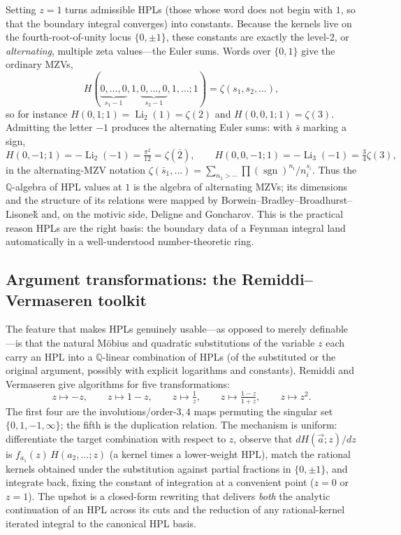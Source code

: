 \documentclass[11pt]{article}
\DeclareMathOperator{\Li}{Li}
\theoremstyle{plain}
\theoremstyle{remark}
\begin{document}
Setting $z=1$ turns admissible HPLs (those whose word does not begin with $1$, so that the boundary integral converges) into constants. Because the kernels live on the fourth-root-of-unity locus $\{0,\pm1\}$, these constants are exactly the level-$2$, or \emph{alternating}, multiple zeta values---the Euler sums. Words over $\{0,1\}$ give the ordinary MZVs,
\begin{equation}\label{eq:hpl-mzv}
  H(\underbrace{0,\dots,0}_{s_1-1},1,\underbrace{0,\dots,0}_{s_2-1},1,\dots;1)=\zeta(s_1,s_2,\dots),
\end{equation}
so for instance $H(0,1;1)=\Li_2(1)=\zeta(2)$ and $H(0,0,1;1)=\zeta(3)$. Admitting the letter $-1$ produces the alternating Euler sums: with $\bar s$ marking a sign,
\[
  H(0,-1;1)=-\Li_2(-1)=\tfrac{\pi^2}{12}=\zeta(\bar2),\qquad
  H(0,0,-1;1)=-\Li_3(-1)=\tfrac34\zeta(3),
\]
in the alternating-MZV notation $\zeta(\bar s_1,\dots)=\sum_{n_1>\cdots}\prod(\operatorname{sgn})^{n_i}/n_i^{s_i}$. Thus the $\mathbb{Q}$-algebra of HPL values at $1$ is the algebra of alternating MZVs; its dimensions and the structure of its relations were mapped by Borwein--Bradley--Broadhurst--Lisone\v{k} and, on the motivic side, Deligne and Goncharov. This is the practical reason HPLs are the right basis: the boundary data of a Feynman integral land automatically in a well-understood number-theoretic ring.

\subsection{Argument transformations: the Remiddi--Vermaseren toolkit}

The feature that makes HPLs genuinely usable---as opposed to merely definable---is that the natural M\"obius and quadratic substitutions of the variable $z$ each carry an HPL into a $\mathbb{Q}$-linear combination of HPLs (of the substituted or the original argument, possibly with explicit logarithms and constants). Remiddi and Vermaseren give algorithms for five transformations:
\begin{equation}\label{eq:hpl-transforms}
  z\mapsto -z,\qquad z\mapsto 1-z,\qquad z\mapsto \tfrac1z,\qquad z\mapsto \tfrac{1-z}{1+z},\qquad z\mapsto z^2 .
\end{equation}
The first four are the involutions/order-$3$,$\,4$ maps permuting the singular set $\{0,1,-1,\infty\}$; the fifth is the duplication relation. The mechanism is uniform: differentiate the target combination with respect to $z$, observe that $d H(\vec a;z)/dz$ is $f_{a_1}(z)\,H(a_2,\dots;z)$ (a kernel times a lower-weight HPL), match the rational kernels obtained under the substitution against partial fractions in $\{0,\pm1\}$, and integrate back, fixing the constant of integration at a convenient point ($z=0$ or $z=1$). The upshot is a closed-form rewriting that delivers \emph{both} the analytic continuation of an HPL across its cuts and the reduction of any rational-kernel iterated integral to the canonical HPL basis.
\end{document}
